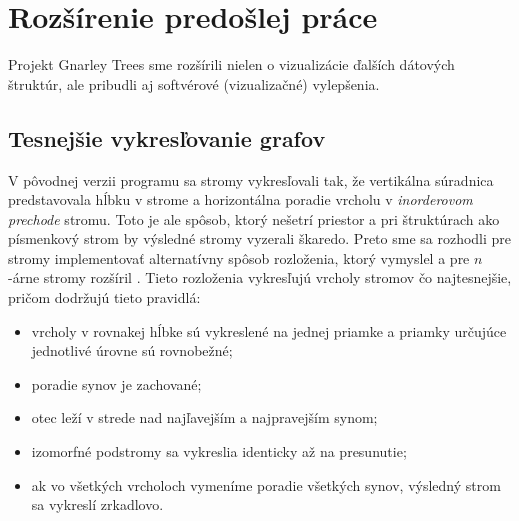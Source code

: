 \section{Rozšírenie predošlej práce}

Projekt Gnarley Trees sme rozšírili nielen o vizualizácie ďalších dátových
štruktúr, ale pribudli aj softvérové (vizualizačné) vylepšenia.

\subsection{Tesnejšie vykresľovanie grafov}
V pôvodnej verzii programu sa stromy vykresľovali tak, že vertikálna súradnica 
predstavovala hĺbku v strome a horizontálna poradie vrcholu v \emph{
inorderovom prechode} stromu. Toto je ale spôsob, ktorý 
nešetrí priestor a pri štruktúrach ako písmenkový strom by výsledné stromy 
vyzerali škaredo. Preto sme sa rozhodli pre stromy implementovať 
alternatívny spôsob rozloženia, ktorý vymyslel \citet{reingold} a pre $n$-árne 
stromy rozšíril \citet{walker}. Tieto rozloženia vykresľujú vrcholy stromov čo 
najtesnejšie, pričom dodržujú tieto pravidlá: 
\begin{itemize} 
\item vrcholy v rovnakej hĺbke sú vykreslené na jednej priamke a priamky 
určujúce jednotlivé úrovne sú rovnobežné; 
\item poradie synov je zachované; 
\item otec leží v strede nad najľavejším a najpravejším synom; 
\item izomorfné podstromy sa vykreslia identicky až na presunutie;
\item ak vo všetkých vrcholoch vymeníme poradie všetkých synov, výsledný strom 
sa vykreslí zrkadlovo.
\end{itemize}

